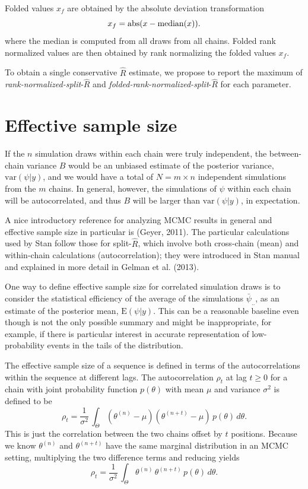 \documentclass[11pt]{article}
\begin{document}
Folded values $x_f$ are obtained by the absolute deviation transformation
\begin{equation}
  x_f = {\rm abs}(x-{\rm median}(x)).
\end{equation}
where the median is computed from all draws from all chains. 
Folded rank normalized values are then obtained by rank normalizing 
the folded values $x_f$.

To obtain a single conservative $\widehat{R}$ estimate, we propose to 
report the maximum of {\em rank-normalized-split}-$\widehat{R}$ and
{\em folded-rank-normalized-split}-$\widehat{R}$ for each parameter.

\section{Effective sample size}

If the $n$ simulation draws within each chain were truly
independent, the between-chain variance $B$ would be an unbiased
estimate of the posterior variance, $\mbox{var}(\psi|y)$, and we would have
a total of $N = m \times n$ independent simulations from the $m$
chains. In general, however, the simulations of $\psi$ within each
chain will be autocorrelated, and thus $B$ will be larger than 
$\mbox{var}(\psi|y)$, in expectation.

A nice introductory reference for analyzing MCMC results in general
and effective sample size in particular is (Geyer, 2011).  The
particular calculations used by Stan follow those for split-$\hat{R}$,
which involve both cross-chain (mean) and within-chain calculations
(autocorrelation); they were introduced in Stan manual and explained
in more detail in Gelman et al. (2013).

One way to define effective sample size for correlated simulation
draws is to consider the statistical efficiency of the average of the
simulations $\bar{\psi}_{..}$, as an estimate of the posterior mean,
$\mbox{E}(\psi|y)$.  This can be a reasonable baseline even though is
not the only possible summary and might be inappropriate, for example,
if there is particular interest in accurate representation of
low-probability events in the tails of the distribution.

The effective sample size of a sequence is defined in terms of the
autocorrelations within the sequence at different lags.  The
autocorrelation $\rho_t$ at lag $t \geq 0$ for a chain with joint
probability function $p(\theta)$ with mean $\mu$ and variance
$\sigma^2$ is defined to be
\begin{equation}
\rho_t
=
\frac{1}{\sigma^2} \, \int_{\Theta} (\theta^{(n)} - \mu)
(\theta^{(n+t)} - \mu) \, p(\theta) \, d\theta.
\end{equation}
This is just the correlation between the two chains offset by $t$
positions.  Because we know $\theta^{(n)}$ and $\theta^{(n+t)}$ have
the same marginal distribution in an MCMC setting, multiplying the
two difference terms and reducing yields
\begin{equation}
\rho_t
=
\frac{1}{\sigma^2} \, \int_{\Theta} \theta^{(n)} \, \theta^{(n+t)} \, p(\theta) \, d\theta.
\end{equation}
\end{document}
